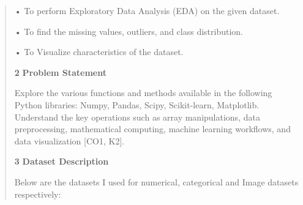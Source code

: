 \documentclass[
]{article}
\begin{document}
\begin{quote}
• To perform Exploratory Data Analysis (EDA) on the given dataset.

• To find the missing values, outliers, and class distribution.

• To Visualize characteristics of the dataset.

\textbf{2} \textbf{Problem Statement}

Explore the various functions and methods available in the following
Python libraries: Numpy, Pandas, Scipy, Scikit-learn, Matplotlib.
Understand the key operations such as array manipulations, data
preprocessing, mathematical computing, machine learning workflows, and
data visualization {[}CO1, K2{]}.

\textbf{3} \textbf{Dataset Description}

Below are the datasets I used for numerical, categorical and Image
datasets respectively:
\end{quote}
\end{document}
